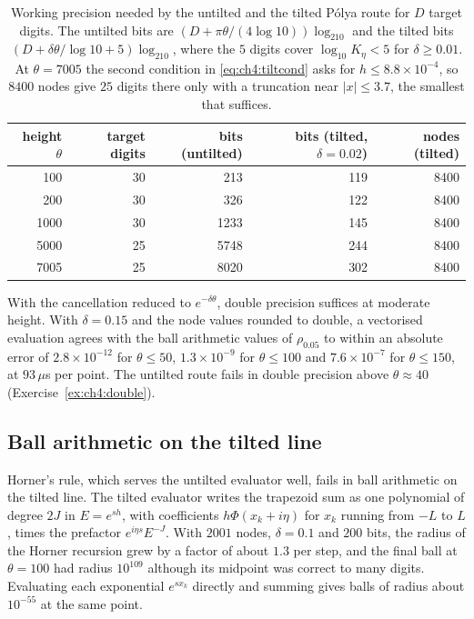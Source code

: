 \begin{table}[htbp]
\centering\small
\begin{tabular}{rrrrr}
\toprule
height $\theta$ & target digits & bits (untilted) & bits (tilted, $\delta=0.02$) & nodes (tilted)\\
\midrule
100 & 30 & 213 & 119 & 8400\\
200 & 30 & 326 & 122 & 8400\\
1000 & 30 & 1233 & 145 & 8400\\
5000 & 25 & 5748 & 244 & 8400\\
7005 & 25 & 8020 & 302 & 8400\\
\bottomrule
\end{tabular}
\caption{Working precision needed by the untilted and the tilted P\'olya route for $D$ target digits. The untilted bits are $(D+\pi\theta/(4\log10))\log_210$ and the tilted bits $(D+\delta\theta/\log10+5)\log_210$, where the $5$ digits cover $\log_{10}K_\eta<5$ for $\delta\ge0.01$. At $\theta=7005$ the second condition in \eqref{eq:ch4:tiltcond} asks for $h\le8.8\times10^{-4}$, so $8400$ nodes give $25$ digits there only with a truncation near $|x|\le3.7$, the smallest that suffices.}
\label{tab:ch4:budget}
\end{table}

With the cancellation reduced to $e^{-\delta\theta}$, double precision suffices at moderate height. With $\delta=0.15$ and the node values rounded to double, a vectorised evaluation agrees with the ball arithmetic values of $\rho_{0.05}$ to within an absolute error of $2.8\times10^{-12}$ for $\theta\le50$, $1.3\times10^{-9}$ for $\theta\le100$ and $7.6\times10^{-7}$ for $\theta\le150$, at $93\,\mu$s per point. The untilted route fails in double precision above $\theta\approx40$ (Exercise~\ref{ex:ch4:double}).

\subsection{Ball arithmetic on the tilted line}\label{sec:ch4:balls}

Horner's rule, which serves the untilted evaluator well, fails in ball arithmetic on the tilted line. The tilted evaluator writes the trapezoid sum as one polynomial of degree $2J$ in $E=e^{sh}$, with coefficients $h\Phi(x_k+i\eta)$ for $x_k$ running from $-L$ to $L$, times the prefactor $e^{i\eta s}E^{-J}$. With $2001$ nodes, $\delta=0.1$ and $200$ bits, the radius of the Horner recursion grew by a factor of about $1.3$ per step, and the final ball at $\theta=100$ had radius $10^{109}$ although its midpoint was correct to many digits. Evaluating each exponential $e^{sx_k}$ directly and summing gives balls of radius about $10^{-55}$ at the same point.

